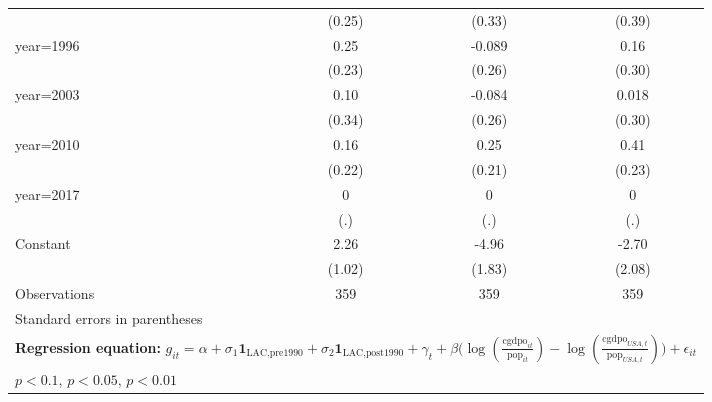 \begin{sidewaystable}[htbp]
\begin{tabular}{l*{3}{c}}
                &   (0.25)         &   (0.33)         &   (0.39)         \\
\addlinespace
year=1996       &     0.25         &   -0.089         &     0.16         \\
                &   (0.23)         &   (0.26)         &   (0.30)         \\
\addlinespace
year=2003       &     0.10         &   -0.084         &    0.018         \\
                &   (0.34)         &   (0.26)         &   (0.30)         \\
\addlinespace
year=2010       &     0.16         &     0.25         &     0.41\sym{*}  \\
                &   (0.22)         &   (0.21)         &   (0.23)         \\
\addlinespace
year=2017       &        0         &        0         &        0         \\
                &      (.)         &      (.)         &      (.)         \\
\addlinespace
Constant        &     2.26\sym{**} &    -4.96\sym{***}&    -2.70         \\
                &   (1.02)         &   (1.83)         &   (2.08)         \\
\midrule
Observations    &      359         &      359         &      359         \\
\bottomrule
\multicolumn{4}{l}{\footnotesize Standard errors in parentheses}\\
\multicolumn{4}{l}{\footnotesize \textbf{Regression equation:} \(g_{it} = \alpha + \sigma_1 \mathbf{1}_{\textrm{LAC,pre1990}} + \sigma_2 \mathbf{1}_{\textrm{LAC,post1990}} + \gamma_t + \beta \big(\log (\frac{\textrm{cgdpo}_{it}}{\textrm{pop}_{it}} ) - \log (\frac{\textrm{cgdpo}_{USA,t}}{\textrm{pop}_{USA,t}}  ) \big) + \epsilon_{it}\)}\\
\multicolumn{4}{l}{\footnotesize \sym{*} \(p<0.1\), \sym{**} \(p<0.05\), \sym{***} \(p<0.01\)}\\
\end{tabular}
\end{sidewaystable}
